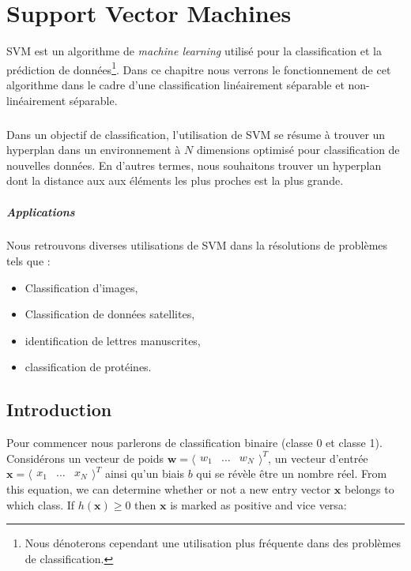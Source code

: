 \chapter{Support Vector Machines}

\gls{SVM} est un algorithme de \textit{machine learning} utilisé pour la classification et la prédiction de données\footnote{Nous dénoterons cependant une utilisation plus fréquente dans des problèmes de classification.}.
Dans ce chapitre nous verrons le fonctionnement de cet algorithme dans le cadre d'une classification linéairement séparable et non-linéairement séparable.

\paragraph{}

Dans un objectif de classification, l'utilisation de \gls{SVM} se résume à trouver un hyperplan dans un environnement à $N$ dimensions optimisé pour classification de nouvelles données.
En d'autres termes, nous souhaitons trouver un hyperplan dont la distance aux aux éléments les plus proches est la plus grande.

\paragraph{Applications}
Nous retrouvons diverses utilisations de \gls{SVM} dans la résolutions de problèmes tels que : 
\begin{itemize}
	\item Classification d'images,
	\item Classification de donn\'ees satellites,
	\item identification de lettres manuscrites,
	\item classification de prot\'eines.
\end{itemize}

\section{Introduction}

Pour commencer nous parlerons de classification binaire (classe 0 et classe 1). Considérons un vecteur de poids $\mathbf w = \langle \begin{matrix} w_1 & \dots & w_N \end{matrix} \rangle^T$, un vecteur d'entrée $\mathbf x = \langle \begin{matrix} x_1 & \dots & x_N \end{matrix} \rangle^T$ ainsi qu'un biais $b$ qui se révèle être un nombre réel.
From this equation, we can determine whether or not a new entry vector $\mathbf x$ belongs to which class.
If $h(\mathbf x) \geq 0$ then $\mathbf x$ is marked as positive and vice versa:

